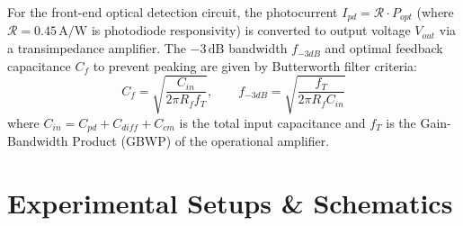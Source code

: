 \documentclass[11pt,a4paper,parskip=half,headsepline=0.6pt,footsepline=0.4pt]{scrartcl}
\begin{document}
For the front-end optical detection circuit, the photocurrent $I_{pd} = \mathcal{R} \cdot P_{opt}$ (where $\mathcal{R} = 0.45\,\text{A/W}$ is photodiode responsivity) is converted to output voltage $V_{out}$ via a transimpedance amplifier. The $-3\,\text{dB}$ bandwidth $f_{-3dB}$ and optimal feedback capacitance $C_f$ to prevent peaking are given by Butterworth filter criteria:
\begin{equation}
  C_f = \sqrt{\frac{C_{in}}{2\pi R_f f_T}}, \qquad f_{-3dB} = \sqrt{\frac{f_T}{2\pi R_f C_{in}}}
\end{equation}
where $C_{in} = C_{pd} + C_{diff} + C_{cm}$ is the total input capacitance and $f_T$ is the Gain-Bandwidth Product (GBWP) of the operational amplifier.

\newpage

\section{Experimental Setups \& Schematics}
\end{document}
